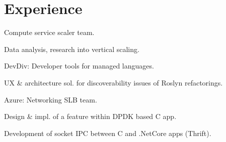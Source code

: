 \documentclass[a4paper]{deedy-resume} %
\begin{document}
\begin{minipage}[t]{0.62\textwidth} %


\section{Experience}


\vspace{\topsep} %
\begin{tightitemize}
\item Compute service scaler team.
\item Data analysis, research into vertical scaling.
\end{tightitemize}

\sectionspace %



\begin{tightitemize}
\item DevDiv: Developer tools for managed languages.
\item UX \& architecture sol. for discoverability issues of Roslyn refactorings.
\end{tightitemize}

\begin{tightitemize}
\item Azure: Networking SLB team.
\item Design \& impl. of a feature within DPDK based C app.
\item Development of socket IPC between C and .NetCore apps (Thrift).
\end{tightitemize}

\sectionspace %




\end{minipage}
\end{document}
